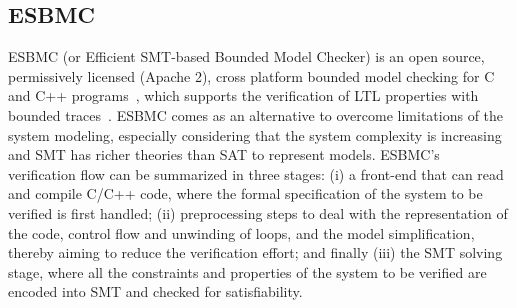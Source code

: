 \documentclass[runningheads]{llncs}
\begin{document}
\subsection{ESBMC}
ESBMC (or Efficient SMT-based Bounded Model Checker) is an open source, permissively licensed (Apache 2), cross platform bounded model checking for C and C++ programs~\cite{esbmc2018}, which supports the verification of LTL properties with bounded traces~\cite{DBLP:journals/sosym/MorseCN015}. 
ESBMC comes as an alternative to overcome limitations of the system modeling, especially considering that the system complexity is increasing and SMT has richer theories than SAT to represent models. 
%
ESBMC's verification flow can be summarized in three stages: (i) a front-end that can read and compile C/C++ code, where the formal specification of the system to be verified is first handled; (ii) preprocessing steps to deal with the representation of the code, control flow and unwinding of loops, and the model simplification, thereby aiming to reduce the verification effort; and finally (iii) the SMT solving stage, where all the constraints and properties of the system to be verified are encoded into SMT and checked for satisfiability.
%
%
%
\end{document}

